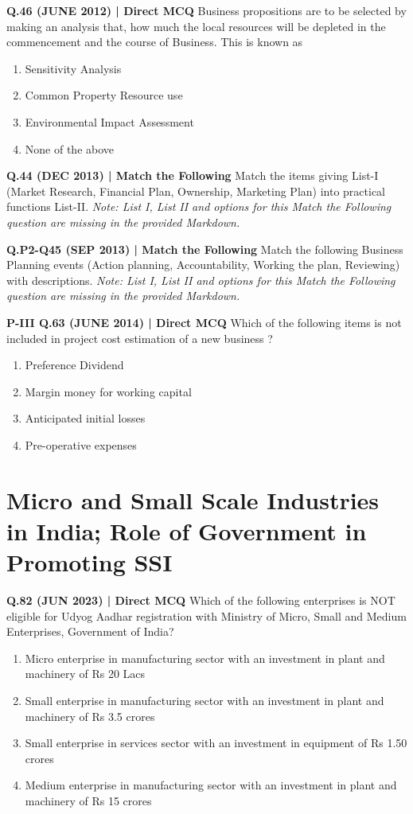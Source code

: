 \documentclass{article}
\begin{document}
\textbf{Q.46 (JUNE 2012) | Direct MCQ}
Business propositions are to be selected by making an analysis that, how much the local resources will be depleted in the commencement and the course of Business. This is known as
\begin{enumerate}[label=(\arabic*)]
    \item Sensitivity Analysis
    \item Common Property Resource use
    \item Environmental Impact Assessment
    \item None of the above
\end{enumerate}

\textbf{Q.44 (DEC 2013) | Match the Following}
Match the items giving List-I (Market Research, Financial Plan, Ownership, Marketing Plan) into practical functions List-II.
\emph{Note: List I, List II and options for this Match the Following question are missing in the provided Markdown.}

\textbf{Q.P2-Q45 (SEP 2013) | Match the Following}
Match the following Business Planning events (Action planning, Accountability, Working the plan, Reviewing) with descriptions.
\emph{Note: List I, List II and options for this Match the Following question are missing in the provided Markdown.}

\textbf{P-III Q.63 (JUNE 2014) | Direct MCQ}
Which of the following items is not included in project cost estimation of a new business ?
\begin{enumerate}[label=(\arabic*)]
    \item Preference Dividend
    \item Margin money for working capital
    \item Anticipated initial losses
    \item Pre-operative expenses
\end{enumerate}

\section{Micro and Small Scale Industries in India; Role of Government in Promoting SSI}

\textbf{Q.82 (JUN 2023) | Direct MCQ}
Which of the following enterprises is NOT eligible for Udyog Aadhar registration with Ministry of Micro, Small and Medium Enterprises, Government of India?
\begin{enumerate}[label=(\arabic*)]
    \item Micro enterprise in manufacturing sector with an investment in plant and machinery of Rs 20 Lacs
    \item Small enterprise in manufacturing sector with an investment in plant and machinery of Rs 3.5 crores
    \item Small enterprise in services sector with an investment in equipment of Rs 1.50 crores
    \item Medium enterprise in manufacturing sector with an investment in plant and machinery of Rs 15 crores
\end{enumerate}
\end{document}
